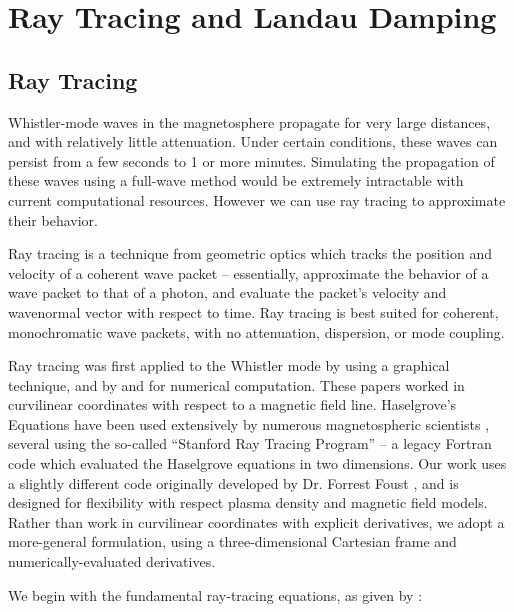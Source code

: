 \section{Ray Tracing and Landau Damping}
\subsection{Ray Tracing}
Whistler-mode waves in the magnetosphere propagate for very large distances, and with relatively little attenuation. Under certain conditions, these waves can persist from a few seconds to 1 or more minutes. Simulating the propagation of these waves using a full-wave method would be extremely intractable with current computational resources. However we can use ray tracing to approximate their behavior.

Ray tracing is a technique from geometric optics which tracks the position and velocity of a coherent wave packet -- essentially, approximate the behavior of a wave packet to that of a photon, and evaluate the packet's velocity and wavenormal vector with respect to time. Ray tracing is best suited for coherent, monochromatic wave packets, with no attenuation, dispersion, or mode coupling. 

Ray tracing was first applied to the Whistler mode by \cite{Haselgrove1955} using a graphical technique, and by \cite{Haselgrove1960} and \cite{Kimura1966} for numerical computation. These papers worked in curvilinear coordinates with respect to a magnetic field line. Haselgrove's Equations have been used extensively by numerous magnetospheric scientists \citep{Kimura1966, Edgar1972, Ngo1989,Ristic1993, Lauben1998, B.Peter2007, Bortnik2005, Kulkarni2009}, several using the so-called ``Stanford Ray Tracing Program'' -- a legacy Fortran code which evaluated the Haselgrove equations in two dimensions. Our work uses a slightly different code originally developed by Dr. Forrest Foust \citep{Golden2010}, and is designed for flexibility with respect plasma density and magnetic field models. Rather than work in curvilinear coordinates with explicit derivatives, we adopt a more-general formulation, using a three-dimensional Cartesian frame and numerically-evaluated derivatives.

We begin with the fundamental ray-tracing equations, as given by \cite{Haselgrove1960, Stix1992}:


